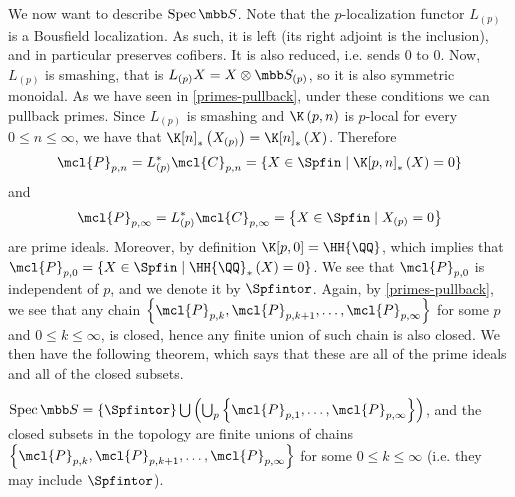 We now want to describe $\spec \SS$.
Note that the $p$-localization functor $L_{\left(p\right)}$ is a Bousfield localization.
As such, it is left (its right adjoint is the inclusion), and in particular preserves cofibers.
It is also reduced, i.e. sends $0$ to $0$.
Now, $L_{\left(p\right)}$ is smashing, that is $L_{\left(p\right)} X = X \otimes \SS_{\left(p\right)}$, so it is also symmetric monoidal.
As we have seen in \ref{primes-pullback}, under these conditions we can pullback primes.
Since $L_{\left(p\right)}$ is smashing and $\K\left(p,n\right)$ is $p$-local for every $0 \leq n \leq \infty$, we have that $\K[n]_*\left(X_{\left(p\right)}\right) = \K[n]_*\left(X\right)$.
Therefore
$$
\mcl{P}_{p, n}
= L_{\left(p\right)}^* \mcl{C}_{p, n}
= \left\{
	X \in \Spfin
	\mid
	\K[p,n]_*\left(X\right) = 0
\right\}
$$
and
$$
\mcl{P}_{p, \infty}
= L_{\left(p\right)}^* \mcl{C}_{p, \infty}
= \left\{
	X \in \Spfin
	\mid
	X_{\left(p\right)} = 0
\right\}
$$
are prime ideals.
Moreover, by definition $\K[p,0] = \HH{\QQ}$, which implies that
$
\mcl{P}_{p, 0}
= \left\{
	X \in \Spfin
	\mid
	{\HH{\QQ}}_*\left(X\right) = 0
\right\}
$.
We see that $\mcl{P}_{p, 0}$ is independent of $p$, and we denote it by $\Spfintor$.
Again, by \ref{primes-pullback}, we see that any chain $\left\{ \mcl{P}_{p, k}, \mcl{P}_{p, k+1}, \dotsc, \mcl{P}_{p, \infty} \right\}$ for some $p$ and $0 \leq k \leq \infty$, is closed, hence any finite union of such chain is also closed.
We then have the following theorem, which says that these are all of the prime ideals and all of the closed subsets.

\begin{theorem}
	$
	\spec \SS
	= \left\{\Spfintor\right\}
	\bigcup \left(\bigcup_p \left\{\mcl{P}_{p, 1}, \dotsc, \mcl{P}_{p, \infty}\right\}\right)
	$,
	and the closed subsets in the topology are finite unions of chains
	$\left\{ \mcl{P}_{p, k}, \mcl{P}_{p, k+1}, \dotsc, \mcl{P}_{p, \infty} \right\}$
	for some $0 \leq k \leq \infty$ (i.e. they may include $\Spfintor$).
\end{theorem}


